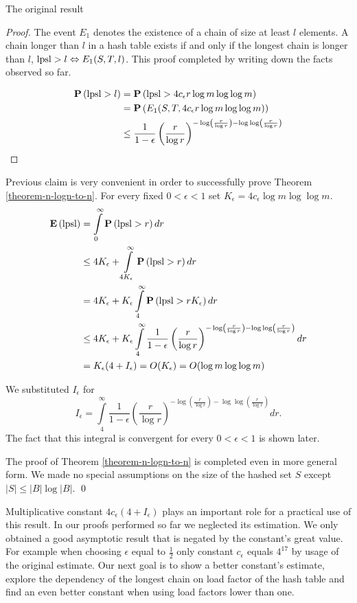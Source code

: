 \begin{section}{The original result}
\begin{proof}
The event $E_1$ denotes the existence of a chain of size at least $l$ elements. A chain longer than $l$ in a hash table exists if and only if the longest chain is longer than $l$, $\mathrm{lpsl} > l \Leftrightarrow E_1(S, T, l)$. This proof completed by writing down the facts observed so far.

\[
\begin{split}
\mathbf{P}\left(\mathrm{lpsl} > l\right) 
	& = \mathbf{P}\left(\mathrm{lpsl} > 4c_{\epsilon} r \log m \log \log m\right) \\
	& = \mathbf{P}\left(E_1(S, T, 4c_{\epsilon} r \log m \log \log m)\right) \\
	& \leq \frac{1}{1 - \epsilon} \left(\frac{r}{\log r}\right)^{-\log \left(\frac{r}{\log r}\right) - \log \log \left(\frac{r}{\log r}\right)} \\
\end{split}
\]
\end{proof}

Previous claim is very convenient in order to successfully prove Theorem \ref{theorem-n-logn-to-n}. For every fixed $0 < \epsilon < 1$ set $K_\epsilon = 4 c_\epsilon \log m \log \log m$.
\[
\begin{split}
\mathbf{E}\left(\mathrm{lpsl}\right)
	& = \int\limits_0^{\infty} \mathbf{P}\left(\mathrm{lpsl} > r\right) dr \\
	& \leq 4K_\epsilon + \int\limits_{4K_\epsilon}^\infty \mathbf{P}\left(\mathrm{lpsl} > r\right) dr \\
	& = 4K_\epsilon + K_\epsilon \int\limits_4^\infty \mathbf{P}\left(\mathrm{lpsl} > rK_\epsilon\right) dr \\
	& \leq 4K_\epsilon + K_\epsilon \int\limits_4^\infty \frac{1}{1 - \epsilon} \left(\frac{r}{\log r}\right)^{-\log \left(\frac{r}{\log r}\right) - \log \log \left(\frac{r}{\log r}\right)} dr \\
	& = K_\epsilon(4 + I_\epsilon) = O(K_\epsilon) = O(\log m \log \log m)
\end{split}
\]

We substituted $I_\epsilon$ for
\[
I_\epsilon = \int\limits_4^\infty \frac{1}{1 - \epsilon} \left(\frac{r}{\log r}\right)^{-\log \left(\frac{r}{\log r}\right) - \log \log \left(\frac{r}{\log r}\right)} dr \text{.}
\]
The fact that this integral is convergent for every $0 < \epsilon < 1$ is shown later.

The proof of Theorem \ref{theorem-n-logn-to-n} is completed even in more general form. We made no special assumptions on the size of the hashed set $S$ except $|S| \leq |B| \log |B|$. \qed

\mbox{\qedhere}

Multiplicative constant $4 c_\epsilon(4 + I_\epsilon)$ plays an important role for a practical use of this result. In our proofs performed so far we neglected its estimation. We only obtained a good asymptotic result that is negated by the constant's great value. For example when choosing $\epsilon$ equal to $\frac{1}{2}$ only constant $c_\epsilon$ equals $4 ^ {17}$ by usage of the original estimate. Our next goal is to show a better constant's estimate, explore the dependency of the longest chain on load factor of the hash table and find an even better constant when using load factors lower than one.
\end{section}

